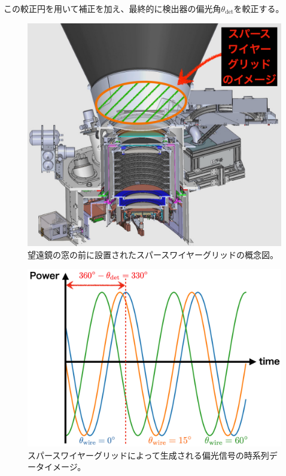 \documentclass[../../main.tex]{subfiles}
\begin{document}
この較正円を用いて補正を加え、最終的に検出器の偏光角$\theta_{\mathrm{det}}$を較正する。
\begin{figure}[H]
    \centering
    \includegraphics[width=0.60\columnwidth]{wiregrid/wiregrid_telescope_image.pdf}
    \caption{望遠鏡の窓の前に設置されたスパースワイヤーグリッドの概念図。
    }
    \label{fig:wiregrid_telescope}
\end{figure}
\begin{figure}[H]
    \centering
    \includegraphics[width=0.7\columnwidth]{wiregrid/wiregrid_tod.pdf}
    \caption[スパースワイヤーグリッドによって生成される偏光信号の時系列データイメージ]{スパースワイヤーグリッドによって生成される偏光信号の時系列データイメージ。}
    \label{fig:wiregrid_mod}
\end{figure}
\end{document}
